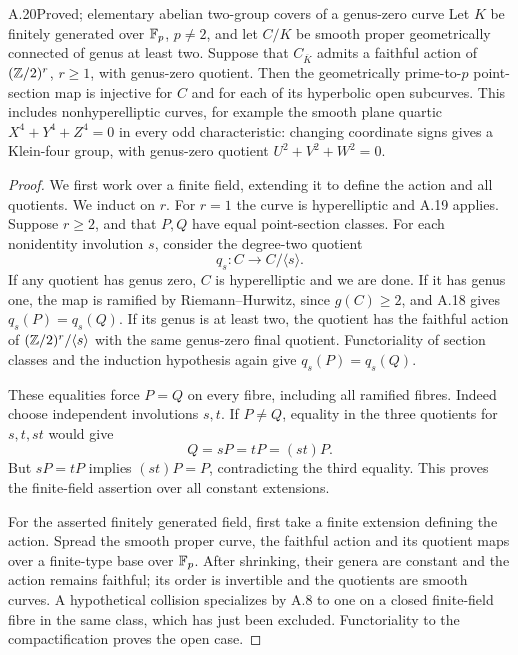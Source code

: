 \begin{claim}{A.20}{Proved; elementary abelian two-group covers of a genus-zero curve}
Let $K$ be finitely generated over $\mathbb F_p$, $p\ne2$, and let
$C/K$ be smooth proper geometrically connected of genus at
least two. Suppose that $C_{\overline K}$ admits a faithful
action of $(\mathbb Z/2)^r$, $r\ge1$, with genus-zero quotient.
Then the geometrically prime-to-$p$ point-section map is
injective for $C$ and for each of its hyperbolic open
subcurves. This includes nonhyperelliptic curves, for example
the smooth plane quartic $X^4+Y^4+Z^4=0$ in every odd
characteristic: changing coordinate signs gives a Klein-four
group, with genus-zero quotient $U^2+V^2+W^2=0$.
\end{claim}
\begin{proof}
We first work over a finite field, extending it to define the
action and all quotients. We induct on $r$. For $r=1$ the
curve is hyperelliptic and A.19 applies. Suppose $r\ge2$,
and that $P,Q$ have equal point-section classes. For each
nonidentity involution $s$, consider the degree-two quotient
\[
 q_s:C\longrightarrow C/\langle s\rangle.
\]
If any quotient has genus zero, $C$ is hyperelliptic and we
are done. If it has genus one, the map is ramified by
Riemann--Hurwitz, since $g(C)\ge2$, and A.18 gives
$q_s(P)=q_s(Q)$. If its genus is at least two, the quotient
has the faithful action of
$(\mathbb Z/2)^r/\langle s\rangle$ with the same genus-zero final
quotient. Functoriality of section classes and the induction
hypothesis again give $q_s(P)=q_s(Q)$.

These equalities force $P=Q$ on every fibre, including all
ramified fibres. Indeed choose independent involutions $s,t$.
If $P\ne Q$, equality in the three quotients for $s,t,st$
would give
\[
 Q=sP=tP=(st)P.
\]
But $sP=tP$ implies $(st)P=P$, contradicting the third
equality. This proves the finite-field assertion over all
constant extensions.

For the asserted finitely generated field, first take a
finite extension defining the action. Spread the smooth
proper curve, the faithful action and its quotient maps over
a finite-type base over $\mathbb F_p$. After shrinking, their genera
are constant and the action remains faithful; its order is
invertible and the quotients are smooth curves. A hypothetical
collision specializes by A.8 to one on a closed finite-field
fibre in the same class, which has just been excluded.
Functoriality to the compactification proves the open case.
\end{proof}

